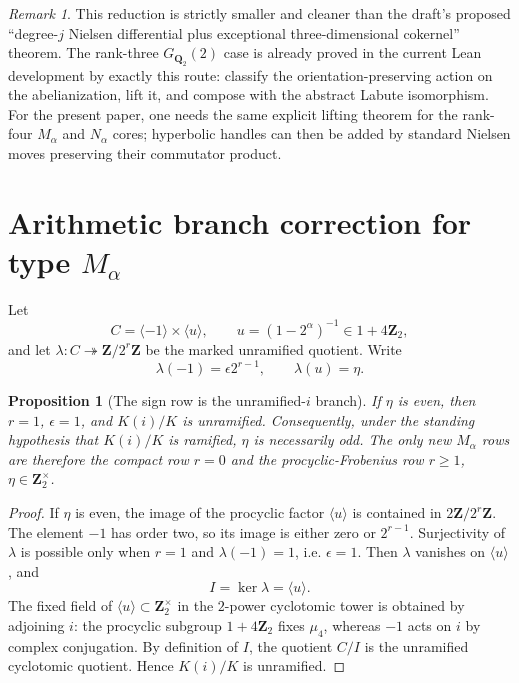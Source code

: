 \documentclass[11pt,reqno]{amsart}
\newtheorem{proposition}[theorem]{Proposition}
\theoremstyle{remark}
\newtheorem{remark}[theorem]{Remark}
\numberwithin{equation}{section}
\newcommand{\Q}{\mathbf Q}
\newcommand{\Z}{\mathbf Z}
\begin{document}
\begin{remark}
This reduction is strictly smaller and cleaner than the draft's proposed
``degree-\(j\) Nielsen differential plus exceptional three-dimensional
cokernel'' theorem.  The rank-three \(G_{\Q_2}(2)\) case is already proved
in the current Lean development by exactly this route: classify the
orientation-preserving action on the abelianization, lift it, and compose
with the abstract Labute isomorphism.  For the present paper, one needs the
same explicit lifting theorem for the rank-four \(M_\alpha\) and
\(N_\alpha\) cores; hyperbolic handles can then be added by standard
Nielsen moves preserving their commutator product.
\end{remark}

\section{Arithmetic branch correction for type \texorpdfstring{\(M_\alpha\)}{M-alpha}}

Let
\[
 C=\langle-1\rangle\times\langle u\rangle,
 \qquad u=(1-2^\alpha)^{-1}\in1+4\Z_2,
\]
and let \(\lambda:C\twoheadrightarrow\Z/2^r\Z\) be the marked
unramified quotient.  Write
\[
 \lambda(-1)=\epsilon2^{r-1},\qquad \lambda(u)=\eta.
\]

\begin{proposition}[The sign row is the unramified-\(i\) branch]
\label{prop:sign-excluded}
If \(\eta\) is even, then \(r=1\), \(\epsilon=1\), and \(K(i)/K\) is
unramified.  Consequently, under the standing hypothesis that
\(K(i)/K\) is ramified, \(\eta\) is necessarily odd.  The only new
\(M_\alpha\) rows are therefore the compact row \(r=0\) and the
procyclic-Frobenius row \(r\ge1\), \(\eta\in\Z_2^\times\).
\end{proposition}

\begin{proof}
If \(\eta\) is even, the image of the procyclic factor
\(\langle u\rangle\) is contained in
\(2\Z/2^r\Z\).  The element \(-1\) has order two, so its image is either
zero or \(2^{r-1}\).  Surjectivity of \(\lambda\) is possible only when
\(r=1\) and \(\lambda(-1)=1\), i.e. \(\epsilon=1\).  Then
\(\lambda\) vanishes on \(\langle u\rangle\), and
\[
 I=\ker\lambda=\langle u\rangle.
\]
The fixed field of \(\langle u\rangle\subset\Z_2^\times\) in the
\(2\)-power cyclotomic tower is obtained by adjoining \(i\): the
procyclic subgroup \(1+4\Z_2\) fixes \(\mu_4\), whereas \(-1\) acts on
\(i\) by complex conjugation.  By definition of \(I\), the quotient
\(C/I\) is the unramified cyclotomic quotient.  Hence \(K(i)/K\) is
unramified.
\end{proof}
\end{document}
